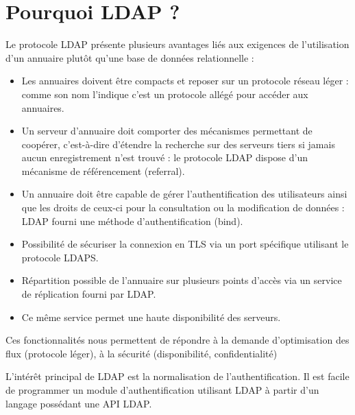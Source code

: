 \documentclass[11pt,fleqn]{report}
\begin{document}
\chapter{Pourquoi LDAP ?}
Le protocole LDAP présente plusieurs avantages liés aux exigences de l’utilisation d’un annuaire plutôt qu’une base de données relationnelle :
\begin{itemize}
\item Les annuaires doivent être compacts et reposer sur un protocole réseau léger : comme son nom l’indique c’est un protocole allégé pour accéder aux annuaires.
\item Un serveur d'annuaire doit comporter des mécanismes permettant de coopérer, c'est-à-dire d'étendre la recherche sur des serveurs tiers si jamais aucun enregistrement n'est trouvé : le protocole LDAP dispose d’un mécanisme de référencement (referral).
\item Un annuaire doit être capable de gérer l'authentification des utilisateurs ainsi que les droits de ceux-ci pour la consultation ou la modification de données : LDAP fourni une méthode d’authentification (bind).
\item Possibilité de sécuriser la connexion en TLS via un port spécifique utilisant le protocole LDAPS.
\item Répartition possible de l’annuaire sur plusieurs points d’accès via un service de réplication fourni par LDAP.
\item Ce même service permet une haute disponibilité des serveurs.
\end{itemize}
Ces fonctionnalités nous permettent de répondre à la demande d'optimisation des flux (protocole léger), à la sécurité (disponibilité, confidentialité)


L'intérêt principal de LDAP est la normalisation de l'authentification. Il est facile de programmer un module d'authentification utilisant LDAP à partir d'un langage possédant une API LDAP.
\end{document}
